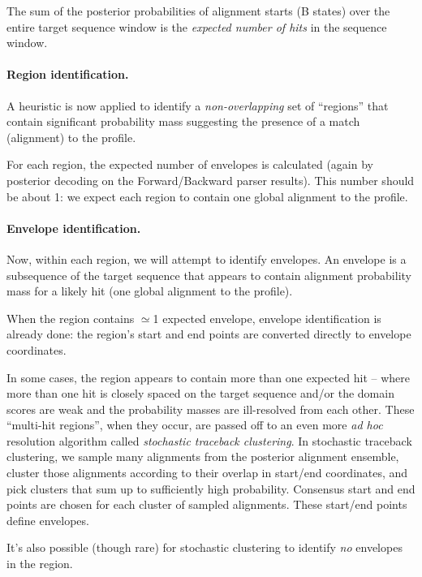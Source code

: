 \begin{sreoutput}
The sum of the posterior probabilities of alignment starts (B states)
over the entire target sequence window is the \emph{expected number of
hits} in the sequence window.

\paragraph{Region identification.}

A heuristic is now applied to identify a \emph{non-overlapping} set of
``regions'' that contain significant probability mass suggesting the
presence of a match (alignment) to the profile.

For each region, the expected number of envelopes is calculated (again
by posterior decoding on the Forward/Backward parser results). This
number should be about 1: we expect each region to contain one global
alignment to the profile. 

\paragraph{Envelope identification.}

Now, within each region, we will attempt to identify envelopes.
An envelope is a subsequence of the target sequence that
appears to contain alignment probability mass for a likely hit (one
global alignment to the profile).

When the region contains $\simeq$1 expected envelope, envelope
identification is already done: the region's start and end points are
converted directly to envelope coordinates.

In some cases, the region appears to contain more than
one expected hit -- where more than one hit is closely spaced on
the target sequence and/or the domain scores are weak and the
probability masses are ill-resolved from each other. These
``multi-hit regions'', when they occur, are passed off to an even
more \emph{ad hoc} resolution algorithm called \emph{stochastic
  traceback clustering}. In stochastic traceback clustering, we sample
many alignments from the posterior alignment ensemble, cluster those
alignments according to their overlap in start/end coordinates, and
pick clusters that sum up to sufficiently high probability. Consensus
start and end points are chosen for each cluster of sampled
alignments. These start/end points define envelopes.

It's also possible (though rare) for stochastic clustering to identify
\emph{no} envelopes in the region.


\end{sreoutput}
